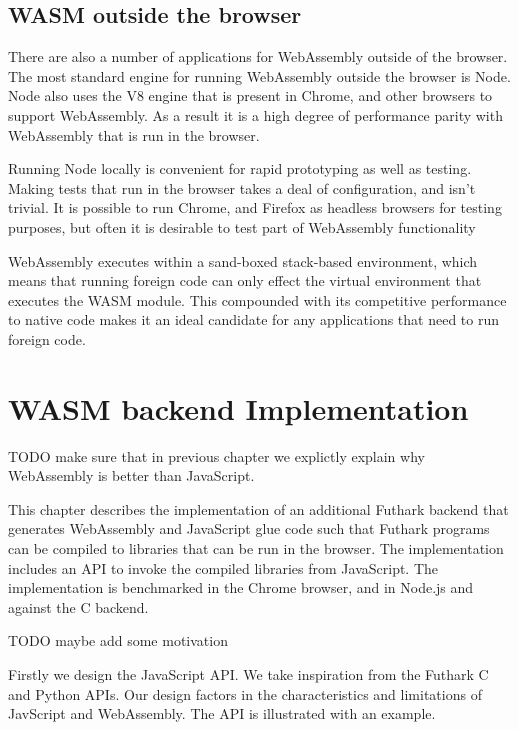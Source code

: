 \documentclass[11pt]{book}
\begin{document}
\section{WASM outside the browser}

There are also a number of applications for WebAssembly outside of the browser. The most standard engine for running WebAssembly outside the browser is Node. Node also uses the V8 engine that is present in Chrome, and other browsers to support WebAssembly. As a result it is a high degree of performance parity with WebAssembly that is run in the browser.

Running Node locally is convenient for rapid prototyping as well as testing. Making tests that run in the browser takes a deal of configuration, and isn't trivial. It is possible to run Chrome, and Firefox as headless browsers for testing purposes, but often it is desirable to test part of WebAssembly functionality


WebAssembly executes within a sand-boxed stack-based environment, which means that running foreign code can only effect the virtual environment that executes the WASM module. This compounded with its competitive performance to native code makes it an ideal candidate for any applications that need to run foreign code. 




\chapter{WASM backend Implementation}

TODO make sure that in previous chapter we explictly explain why WebAssembly is better than JavaScript. 



This chapter describes the implementation of an additional Futhark backend that generates WebAssembly and JavaScript glue code such that Futhark programs can be compiled to libraries that can be run in the browser. The implementation includes an API to invoke the compiled libraries from JavaScript. The implementation is benchmarked in the Chrome browser, and in Node.js and against the C backend.

TODO maybe add some motivation

Firstly we design the JavaScript API. We take inspiration from the Futhark C and Python APIs. Our design factors in the characteristics and limitations of JavScript and WebAssembly. The API is illustrated with an example.
\end{document}
